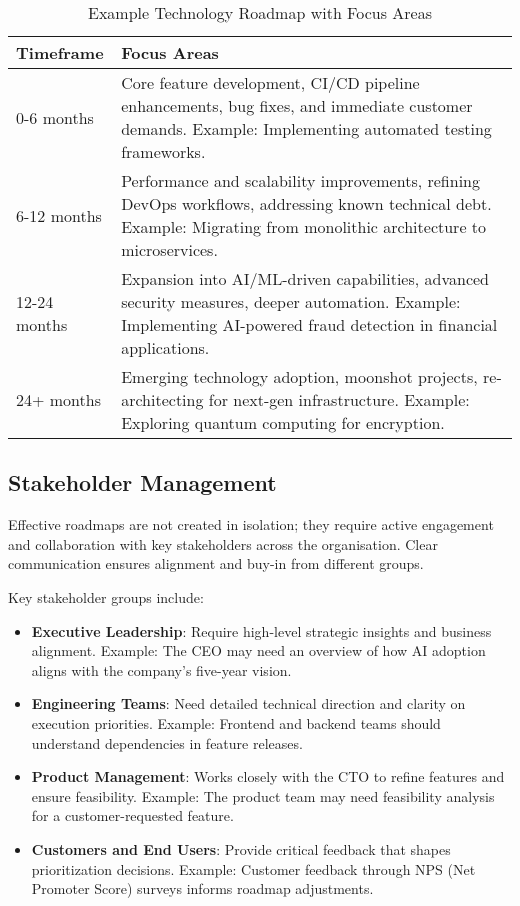 \begin{table}[h]
    \centering
    \begin{tabular}{|l|p{10cm}|}
        \hline
        \textbf{Timeframe} & \textbf{Focus Areas}                                                                                                                                                    \\
        \hline
        0-6 months         & Core feature development, CI/CD pipeline enhancements, bug fixes, and immediate customer demands. Example: Implementing automated testing frameworks.                   \\
        6-12 months        & Performance and scalability improvements, refining DevOps workflows, addressing known technical debt. Example: Migrating from monolithic architecture to microservices. \\
        12-24 months       & Expansion into AI/ML-driven capabilities, advanced security measures, deeper automation. Example: Implementing AI-powered fraud detection in financial applications.    \\
        24+ months         & Emerging technology adoption, moonshot projects, re-architecting for next-gen infrastructure. Example: Exploring quantum computing for encryption.                      \\
        \hline
    \end{tabular}
    \caption{Example Technology Roadmap with Focus Areas}
\end{table}

\subsection{Stakeholder Management}

Effective roadmaps are not created in isolation; they require active engagement and collaboration with key stakeholders across the organisation. Clear communication ensures alignment and buy-in from different groups.

Key stakeholder groups include:

\begin{itemize}
    \item \textbf{Executive Leadership}: Require high-level strategic insights and business alignment. Example: The CEO may need an overview of how AI adoption aligns with the company's five-year vision.
    \item \textbf{Engineering Teams}: Need detailed technical direction and clarity on execution priorities. Example: Frontend and backend teams should understand dependencies in feature releases.
    \item \textbf{Product Management}: Works closely with the CTO to refine features and ensure feasibility. Example: The product team may need feasibility analysis for a customer-requested feature.
    \item \textbf{Customers and End Users}: Provide critical feedback that shapes prioritization decisions. Example: Customer feedback through NPS (Net Promoter Score) surveys informs roadmap adjustments.
\end{itemize}

